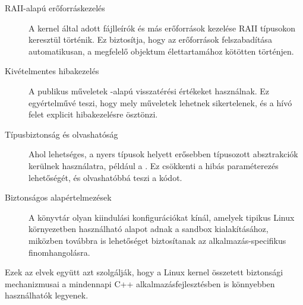 \begin{description}
  \item[RAII-alapú erőforráskezelés]
  A kernel által adott fájlleírók és más erőforrások kezelése RAII típusokon
  keresztül történik. Ez biztosítja, hogy az erőforrások felszabadítása
  automatikusan, a megfelelő objektum élettartamához kötötten történjen.

  \item[Kivételmentes hibakezelés]
  A publikus műveletek -alapú visszatérési értékeket
  használnak. Ez egyértelművé teszi, hogy mely műveletek lehetnek sikertelenek,
  és a hívó felet explicit hibakezelésre ösztönzi.

  \item[Típusbiztonság és olvashatóság]
  Ahol lehetséges, a nyers típusok helyett erősebben típusozott absztrakciók
  kerülnek használatra, például a . Ez csökkenti a hibás
  paraméterezés lehetőségét, és olvashatóbbá teszi a kódot.

  \item[Biztonságos alapértelmezések]
  A könyvtár olyan kiindulási konfigurációkat kínál, amelyek tipikus Linux
  környezetben használható alapot adnak a sandbox kialakításához, miközben
  továbbra is lehetőséget biztosítanak az alkalmazás-specifikus
  finomhangolásra.
\end{description}

Ezek az elvek együtt azt szolgálják, hogy a Linux kernel összetett biztonsági
mechanizmusai a mindennapi C++ alkalmazásfejlesztésben is könnyebben
használhatók legyenek.
